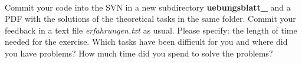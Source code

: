 \\
Commit your code into the SVN in a new subdirectory 
\textbf{uebungsblatt\_\ExerciseSheetNumber} and a PDF with the solutions of the 
theoretical tasks in the same folder. Commit your feedback in a text file 
\emph{erfahrungen.txt} as usual. Please specify: the length of time needed for 
the exercise. Which tasks have been difficult for you and where did you have 
problems? How much time did you spend to solve the problems?
